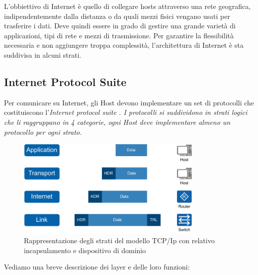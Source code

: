 L'obbiettivo di Internet è quello di collegare hosts attraverso una rete geografica, indipendentemente dalla distanza o da quali mezzi fisici vengano usati per trasferire i dati. Deve quindi essere in grado di gestire una grande varietà di applicazioni, tipi di rete e mezzi di trasmissione. Per garantire la flessibilità necessaria e non aggiungere troppa complessità, l'architettura di Internet è sta suddivisa in alcuni strati.


\subsection{Internet Protocol Suite}


Per comunicare su Internet, gli Host devono implementare un set di protocolli che costituiscono l'\it{Internet protocol suite} \cite{RFC_1122}. I protocolli si suddividono in strati logici che li raggruppano in 4 categorie, ogni Host deve implementare almeno un protocollo per ogni strato.

\begin{figure}[H]
    \centering
    \includegraphics[width=0.8\textwidth]{immagini/diag2-modello_a_strati}
    \caption{Rappresentazione degli strati del modello TCP/Ip con relativo incapsulamento e dispositivo di dominio}
    \label{fig:modello-a-strati}
\end{figure}



Vediamo una breve descrizione dei layer e delle loro funzioni:

